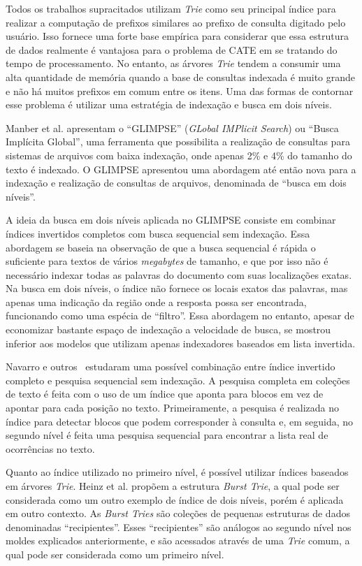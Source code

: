 Todos os trabalhos supracitados utilizam \textit{Trie} como seu principal índice para realizar a computação de prefixos similares ao prefixo de consulta digitado pelo usuário. Isso fornece uma forte base empírica para considerar que essa estrutura de dados realmente é vantajosa para o problema de CATE em se tratando do tempo de processamento. No entanto, as árvores \textit{Trie} tendem a consumir uma alta quantidade de memória quando a base de consultas indexada é muito grande e não há muitos prefixos em comum entre os itens. Uma das formas de contornar esse problema é utilizar uma estratégia de indexação e busca em dois níveis.

Manber et al. \citep{manber1994glimpse} apresentam o ``GLIMPSE'' (\textit{GLobal IMPlicit Search}) ou ``Busca Implícita Global'', uma ferramenta que possibilita a realização de consultas para sistemas de arquivos com baixa indexação, onde apenas 2\% e 4\% do tamanho do texto é indexado. O GLIMPSE apresentou uma abordagem até então nova para a indexação e realização de consultas de arquivos, denominada de ``busca em dois níveis''.

A ideia da busca em dois níveis aplicada no GLIMPSE consiste em combinar índices invertidos completos com busca sequencial sem indexação. Essa abordagem se baseia na observação de que a busca sequencial é rápida o suficiente para textos de vários \textit{megabytes} de tamanho, e que por isso não é necessário indexar todas as palavras do documento com suas localizações exatas. Na busca em dois níveis, o índice não fornece os locais exatos das palavras, mas apenas uma indicação da região onde a resposta possa ser encontrada, funcionando como uma espécia de ``filtro''. Essa abordagem no entanto, apesar de economizar bastante espaço de indexação a velocidade de busca, se mostrou inferior aos modelos que utilizam apenas indexadores baseados em lista invertida.

Navarro e outros~\citep{navarro2000adding}  estudaram uma possível combinação entre índice invertido completo e pesquisa sequencial sem indexação. A pesquisa completa em coleções de texto é feita com o uso de um índice que aponta para blocos em vez de apontar para cada posição no texto. Primeiramente, a pesquisa é realizada no índice para detectar blocos que podem corresponder à consulta e, em seguida, no segundo nível é feita uma pesquisa sequencial para encontrar a lista real de
ocorrências no texto.

Quanto ao índice utilizado no primeiro nível, é possível utilizar índices baseados em árvores \textit{Trie}. Heinz et al. \citep{heinz2002burst} propõem a estrutura \textit{Burst Trie}, a qual pode ser considerada como um outro exemplo de índice de dois níveis, porém é aplicada em outro contexto. As \textit{Burst \textit{Trie}s} são coleções de pequenas estruturas de dados denominadas ``recipientes''. Esses ``recipientes'' são análogos ao segundo nível nos moldes explicados anteriormente, e são acessados através de uma \textit{Trie} comum, a qual pode ser considerada como um primeiro nível.

